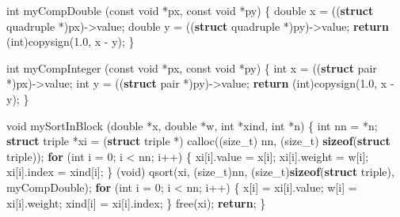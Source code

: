 \documentclass[
  12pt,
]{book}
\newenvironment{Shaded}{\begin{snugshade}}{\end{snugshade}}
\newcommand{\ControlFlowTok}[1]{\textcolor[rgb]{0.13,0.29,0.53}{\textbf{#1}}}
\newcommand{\DataTypeTok}[1]{\textcolor[rgb]{0.13,0.29,0.53}{#1}}
\newcommand{\DecValTok}[1]{\textcolor[rgb]{0.00,0.00,0.81}{#1}}
\newcommand{\FloatTok}[1]{\textcolor[rgb]{0.00,0.00,0.81}{#1}}
\newcommand{\KeywordTok}[1]{\textcolor[rgb]{0.13,0.29,0.53}{\textbf{#1}}}
\newcommand{\NormalTok}[1]{#1}
\theoremstyle{definition}
\theoremstyle{definition}
\theoremstyle{definition}
\theoremstyle{definition}
\theoremstyle{remark}
\begin{document}
\begin{Shaded}
\begin{Highlighting}[]
\DataTypeTok{int}\NormalTok{ myCompDouble (}\DataTypeTok{const} \DataTypeTok{void}\NormalTok{ *px, }\DataTypeTok{const} \DataTypeTok{void}\NormalTok{ *py) \{}
    \DataTypeTok{double}\NormalTok{ x = ((}\KeywordTok{struct}\NormalTok{ quadruple *)px){-}\textgreater{}value;}
    \DataTypeTok{double}\NormalTok{ y = ((}\KeywordTok{struct}\NormalTok{ quadruple *)py){-}\textgreater{}value;}
    \ControlFlowTok{return}\NormalTok{ (}\DataTypeTok{int}\NormalTok{)copysign(}\FloatTok{1.0}\NormalTok{, x {-} y);}
\NormalTok{\}}

\DataTypeTok{int}\NormalTok{ myCompInteger (}\DataTypeTok{const} \DataTypeTok{void}\NormalTok{ *px, }\DataTypeTok{const} \DataTypeTok{void}\NormalTok{ *py) \{}
    \DataTypeTok{int}\NormalTok{ x = ((}\KeywordTok{struct}\NormalTok{ pair *)px){-}\textgreater{}value;}
    \DataTypeTok{int}\NormalTok{ y = ((}\KeywordTok{struct}\NormalTok{ pair *)py){-}\textgreater{}value;}
    \ControlFlowTok{return}\NormalTok{ (}\DataTypeTok{int}\NormalTok{)copysign(}\FloatTok{1.0}\NormalTok{, x {-} y);}
\NormalTok{\}}

\DataTypeTok{void}\NormalTok{ mySortInBlock (}\DataTypeTok{double}\NormalTok{ *x, }\DataTypeTok{double}\NormalTok{ *w, }\DataTypeTok{int}\NormalTok{ *xind, }\DataTypeTok{int}\NormalTok{ *n) \{}
    \DataTypeTok{int}\NormalTok{ nn = *n;}
    \KeywordTok{struct}\NormalTok{ triple *xi =}
\NormalTok{        (}\KeywordTok{struct}\NormalTok{ triple *) calloc((}\DataTypeTok{size\_t}\NormalTok{) nn, (}\DataTypeTok{size\_t}\NormalTok{) }\KeywordTok{sizeof}\NormalTok{(}\KeywordTok{struct}\NormalTok{ triple));}
    \ControlFlowTok{for}\NormalTok{ (}\DataTypeTok{int}\NormalTok{ i = }\DecValTok{0}\NormalTok{; i \textless{} nn; i++) \{}
\NormalTok{        xi[i].value = x[i];}
\NormalTok{        xi[i].weight = w[i];}
\NormalTok{        xi[i].index = xind[i];}
\NormalTok{    \}}
\NormalTok{    (}\DataTypeTok{void}\NormalTok{) qsort(xi, (}\DataTypeTok{size\_t}\NormalTok{)nn, (}\DataTypeTok{size\_t}\NormalTok{)}\KeywordTok{sizeof}\NormalTok{(}\KeywordTok{struct}\NormalTok{ triple), myCompDouble);}
    \ControlFlowTok{for}\NormalTok{ (}\DataTypeTok{int}\NormalTok{ i = }\DecValTok{0}\NormalTok{; i \textless{} nn; i++) \{}
\NormalTok{        x[i] = xi[i].value;}
\NormalTok{        w[i] = xi[i].weight;}
\NormalTok{        xind[i] = xi[i].index;}
\NormalTok{    \}}
\NormalTok{    free(xi);}
    \ControlFlowTok{return}\NormalTok{;}
\NormalTok{\}}



\end{Highlighting}
\end{Shaded}
\end{document}
